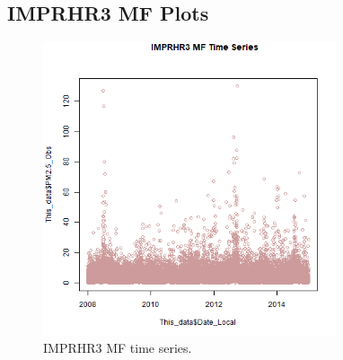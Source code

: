 
\subsection{IMPRHR3 MF Plots}
\begin{figure} 
\centering 
\includegraphics[width=0.77\textwidth]{Code_Outputs/IMPRHR3MF_time_series.png} 
\caption{\label{fig:IMPRHR3MFTS}IMPRHR3 MF time series.} 
\end{figure} 
 
